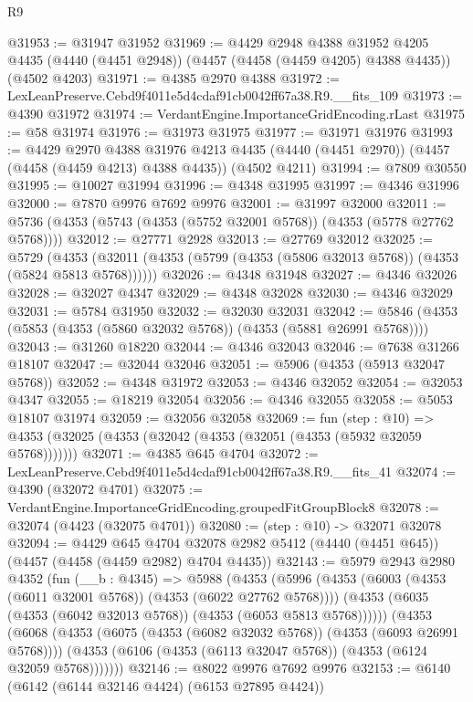 \begin{lexlean}{R9}
\begin{coremodule}
@31953 := @31947 @31952
@31969 := @4429
    @2948
    @4388
    @31952
    @4205
    @4435
    (@4440 (@4451 @2948))
    (@4457 (@4458 (@4459 @4205) @4388 @4435))
    (@4502 @4203)
@31971 := @4385 @2970 @4388
@31972 := LexLeanPreserve.Cebd9f4011e5d4cdaf91cb0042ff67a38.R9.__fits_109
@31973 := @4390 @31972
@31974 := VerdantEngine.ImportanceGridEncoding.rLast
@31975 := @58 @31974
@31976 := @31973 @31975
@31977 := @31971 @31976
@31993 := @4429
    @2970
    @4388
    @31976
    @4213
    @4435
    (@4440 (@4451 @2970))
    (@4457 (@4458 (@4459 @4213) @4388 @4435))
    (@4502 @4211)
@31994 := @7809 @30550
@31995 := @10027 @31994
@31996 := @4348 @31995
@31997 := @4346 @31996
@32000 := @7870 @9976 @7692 @9976
@32001 := @31997 @32000
@32011 := @5736 (@4353 (@5743 (@4353 (@5752 @32001 @5768)) (@4353 (@5778 @27762 @5768))))
@32012 := @27771 @2928
@32013 := @27769 @32012
@32025 := @5729
    (@4353 (@32011 (@4353 (@5799 (@4353 (@5806 @32013 @5768)) (@4353 (@5824 @5813 @5768))))))
@32026 := @4348 @31948
@32027 := @4346 @32026
@32028 := @32027 @4347
@32029 := @4348 @32028
@32030 := @4346 @32029
@32031 := @5784 @31950
@32032 := @32030 @32031
@32042 := @5846 (@4353 (@5853 (@4353 (@5860 @32032 @5768)) (@4353 (@5881 @26991 @5768))))
@32043 := @31260 @18220
@32044 := @4346 @32043
@32046 := @7638 @31266 @18107
@32047 := @32044 @32046
@32051 := @5906 (@4353 (@5913 @32047 @5768))
@32052 := @4348 @31972
@32053 := @4346 @32052
@32054 := @32053 @4347
@32055 := @18219 @32054
@32056 := @4346 @32055
@32058 := @5053 @18107 @31974
@32059 := @32056 @32058
@32069 := fun (step : @10) =>
  @4353 (@32025 (@4353 (@32042 (@4353 (@32051 (@4353 (@5932 @32059 @5768)))))))
@32071 := @4385 @645 @4704
@32072 := LexLeanPreserve.Cebd9f4011e5d4cdaf91cb0042ff67a38.R9.__fits_41
@32074 := @4390 (@32072 @4701)
@32075 := VerdantEngine.ImportanceGridEncoding.groupedFitGroupBlock8
@32078 := @32074 (@4423 (@32075 @4701))
@32080 := (step : @10) -> @32071 @32078
@32094 := @4429
    @645
    @4704
    @32078
    @2982
    @5412
    (@4440 (@4451 @645))
    (@4457 (@4458 (@4459 @2982) @4704 @4435))
@32143 := @5979
    @2943
    @2980
    @4352
    (fun (__b : @4345) =>
    @5988
      (@4353
        (@5996
          (@4353 (@6003 (@4353 (@6011 @32001 @5768)) (@4353 (@6022 @27762 @5768))))
          (@4353 (@6035 (@4353 (@6042 @32013 @5768)) (@4353 (@6053 @5813 @5768))))))
      (@4353
        (@6068
          (@4353 (@6075 (@4353 (@6082 @32032 @5768)) (@4353 (@6093 @26991 @5768))))
          (@4353 (@6106 (@4353 (@6113 @32047 @5768)) (@4353 (@6124 @32059 @5768)))))))
@32146 := @8022 @9976 @7692 @9976
@32153 := @6140 (@6142 (@6144 @32146 @4424) (@6153 @27895 @4424))

\end{coremodule}
\end{lexlean}
